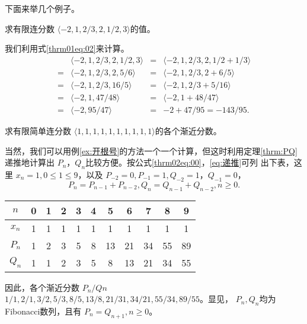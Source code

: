 下面来举几个例子。
\begin{example}
	求有限连分数 \( \langle -2, 1, 2/3, 2, 1/2, 3 \rangle \)的值。
\end{example}
\begin{solution}
	我们利用式\eqref{thrm01eq:02}来计算。
	\begin{align*}
		  & \langle -2, 1, 2/3, 2, 1/2, 3 \rangle & = & \langle -2, 1, 2/3, 2, 1/2 + 1/3 \rangle \\
		= & \langle -2, 1, 2/3, 2, 5/6 \rangle    & = & \langle -2, 1, 2/3, 2 + 6/5 \rangle      \\
		= & \langle -2, 1, 2/3, 16/5 \rangle      & = & \langle -2, 1, 2/3 + 5/16 \rangle        \\
		= & \langle -2, 1, 47/48 \rangle          & = & \langle -2, 1 + 48/47 \rangle            \\
		= & \langle -2, 95/47 \rangle             & = & -2 + 47/95 = -143/95.
	\end{align*}
\end{solution}

\begin{example}
	求有限简单连分数 \( \langle 1,1,1,1,1,1,1,1,1,1 \rangle \)的各个渐近分数。
\end{example}
\begin{solution}
	当然，我们可以用例\ref{ex:开根号}的方法一个一个计算，但这时利用定理\ref{thrm:PQ}递推地计算出 \( P_n，Q_n
	\)比较方便。按公式\eqref{thrm02eq:00}，\eqref{eq:递推}可列
	出下表，这里 \( x_n=1,0 \leqslant 1 \leqslant 9 \)，以及 \( P_{-2}=0,P_{-1}=1,Q_{-2}=1，Q_{-1} = 0 \)，
	\begin{equation*}
		P_n = P_{n-1} + P_{n-2}, Q_n = Q_{n-1} + Q_{n-2}, n \geqslant 0.
	\end{equation*}

	\begin{table}[htbp]
		\centering
		\begin{tabular}{c c c c c c c c c c c}\toprule
			\( n \)   & 0 & 1 & 2 & 3 & 4 & 5  & 6  & 7  & 8  & 9  \\ \midrule
			\( x_n \) & 1 & 1 & 1 & 1 & 1 & 1  & 1  & 1  & 1  & 1  \\
			\( P_n \) & 1 & 2 & 3 & 5 & 8 & 13 & 21 & 34 & 55 & 89 \\
			\( Q_n \) & 1 & 1 & 2 & 3 & 5 & 8  & 13 & 21 & 34 & 55 \\ \bottomrule
		\end{tabular}
	\end{table}
	因此，各个渐近分数 \( P_n/Qn \) \( 1/1, 2/1, 3/2, 5/3, 8/5, 13/8, 21/31, 34/21, 55/34, 89/55 \)。显见， \( P_n, Q_n
	\)均为Fibonacci数列，且有 \( P_n = Q_{n+1}, n \geqslant 0 \)。
\end{solution}
